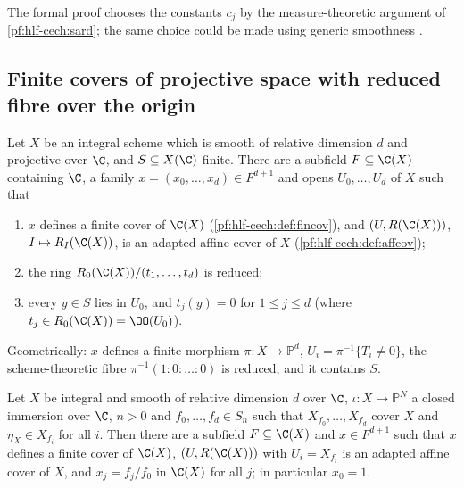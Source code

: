 \begin{remark}\label{pf:hlf-cech:rem:sard}
The formal proof chooses the constants $c_j$ by the measure-theoretic argument of \cref{pf:hlf-cech:sard}; the same choice could be made
using generic smoothness \cite[Cor.~III.10.7]{Hartshorne1977}.
\end{remark}

\subsection{Finite covers of projective space with reduced fibre over the origin}\label{sec:pf:hlf-cech:fincov}

\begin{theorem}\label{pf:hlf-cech:fincovthm}
Let $X$ be an integral scheme which is smooth of relative dimension $d$ and projective over $\C$, and $S\subseteq X(\C)$ finite. There are a
subfield $F\subseteq\C(X)$ containing $\C$, a family $x=(x_0,\dots,x_d)\in F^{d+1}$ and opens $U_0,\dots,U_d$ of $X$ such that
\begin{enumerate}[label=(\arabic*),nosep]
\item $x$ defines a finite cover of $\C(X)$ (\cref{pf:hlf-cech:def:fincov}), and $(U,R(\C(X)))$, $I\mapsto R_I(\C(X))$, is an adapted affine cover of $X$
  (\cref{pf:hlf-cech:def:affcov});
\item the ring $R_0(\C(X))/(t_1,\dots,t_d)$ is reduced;
\item every $y\in S$ lies in $U_0$, and $t_j(y)=0$ for $1\le j\le d$ (where $t_j\in R_0(\C(X))=\OO(U_0)$).
\end{enumerate}
\end{theorem}

Geometrically: $x$ defines a finite morphism $\pi\colon X\to\mathbb P^d$, $U_i=\pi^{-1}\{T_i\ne0\}$, the scheme-theoretic fibre $\pi^{-1}(1:0:\dots:0)$
is reduced, and it contains $S$.

\begin{proposition}\label{pf:hlf-cech:formsfincov}
Let $X$ be integral and smooth of relative dimension $d$ over $\C$, $\iota\colon X\to\mathbb P^N$ a closed immersion over $\C$, $n>0$ and
$f_0,\dots,f_d\in S_n$ such that $X_{f_0},\dots,X_{f_d}$ cover $X$ and $\eta_X\in X_{f_i}$ for all $i$. Then there are a subfield $F\subseteq\C(X)$
and $x\in F^{d+1}$ such that $x$ defines a finite cover of $\C(X)$, $(U,R(\C(X)))$ with $U_i=X_{f_i}$ is an adapted affine cover of $X$, and
$x_j=f_j/f_0$ in $\C(X)$ for all $j$; in particular $x_0=1$.
\end{proposition}

